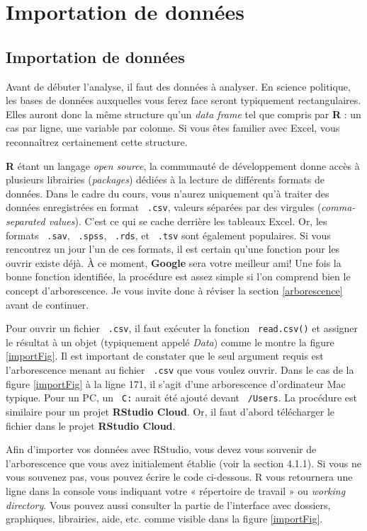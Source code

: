\documentclass[10.5pt,a4paper]{article}
\newcommand{\rcode}[1]{\texttt{\color{rstudio} #1}}
\begin{document}
  
\section{Importation de données}\label{import}
  \subsection{Importation de données}
  Avant de débuter l'analyse, il faut des données à analyser. En science politique, les bases de données auxquelles vous ferez face seront typiquement rectangulaires. Elles auront donc la même structure qu'un \emph{data frame} tel que compris par \textbf{R} : un cas par ligne, une variable par colonne. Si vous êtes familier avec Excel, vous reconnaîtrez certainement cette structure. 
  
  \textbf{R} étant un langage \emph{open source}, la communauté de développement donne accès à plusieurs librairies (\emph{packages}) dédiées à la lecture de différents formats de données. Dans le cadre du cours, vous n'aurez uniquement qu'à traiter des données enregistrées en format \rcode{.csv}, valeurs séparées par des virgules (\emph{comma-separated values}). C'est ce qui se cache derrière les tableaux Excel. Or, les formats \rcode{.sav}, \rcode{.spss}, \rcode{.rds}, et \rcode{.tsv} sont également populaires. Si vous rencontrez un jour l'un de ces formats, il est certain qu'une fonction pour les ouvrir existe déjà. À ce moment, \textbf{Google} sera votre meilleur ami! Une fois la bonne fonction identifiée, la procédure est assez simple si l'on comprend bien le concept d'arborescence. Je vous invite donc à réviser la section \ref{arborescence} avant de continuer. 
  
  Pour ouvrir un fichier \rcode{.csv}, il faut exécuter la fonction \rcode{read.csv()} et assigner le résultat à un objet (typiquement appelé \emph{Data}) comme le montre la figure \ref{importFig}. Il est important de constater que le seul argument requis est l'arborescence menant au fichier \rcode{.csv} que vous voulez ouvrir. Dans le cas de la figure \ref{importFig} à la ligne 171, il s'agit d'une arborescence d'ordinateur Mac typique. Pour un PC, un \rcode{C:} aurait été ajouté devant \rcode{/Users}. La procédure est similaire pour un projet \textbf{RStudio Cloud}. Or, il faut d'abord télécharger le fichier dans le projet \textbf{RStudio Cloud}.
  
  Afin d'importer vos données avec RStudio, vous devez vous souvenir de l'arborescence que vous avez initialement établie (voir la section 4.1.1). Si vous ne vous souvenez pas, vous pouvez écrire le code ci-dessous. R vous retournera une ligne dans la console vous indiquant votre « répertoire de travail » ou \emph{working directory}. Vous pouvez aussi consulter la partie de l'interface avec dossiers, graphiques, librairies, aide, etc. comme visible dans la figure \ref{importFig}.
    
\end{document}
